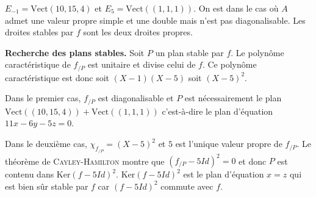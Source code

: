 {\begin{enumerate}
{$E_{-1}=\text{Vect}(10,15,4)$ et $E_5=\text{Vect}((1,1,1))$. On est dans le cas où $A$ admet une valeur propre simple et une double mais n'est pas diagonalisable. Les droites stables par $f$ sont les deux droites propres.

\textbf{Recherche des plans stables.} Soit $P$ un plan stable par $f$. Le polynôme caractéristique de $f_{/P}$ est unitaire et divise celui de $f$. Ce polynôme caractéristique est donc soit $(X-1)(X-5)$ soit $(X-5)^2$.

Dans le premier cas, $f_{/P}$ est diagonalisable et $P$ est nécessairement le plan $\text{Vect}((10,15,4))+\text{Vect}((1,1,1))$  c'est-à-dire le plan d'équation $11x -6y -5z =0$.

Dans le deuxième cas, $\chi_{f_{/P}}=(X-5)^2$ et $5$ est l'unique valeur propre de $f_{/P}$.  Le théorème de \textsc{Cayley}-\textsc{Hamilton} montre que $(f_{/P}-5Id)^2 = 0$ et donc $P$ est contenu dans $\text{Ker}(f-5Id)^2$. $\text{Ker}(f-5Id)^2$ est le plan d'équation $x=z$ qui est bien sûr stable par $f$ car $(f-5Id)^2$ commute avec $f$.}
\end{enumerate}
}
